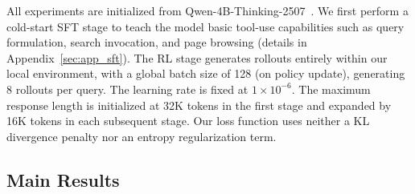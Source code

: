 \documentclass{article} %
\theoremstyle{plain}
\theoremstyle{definition}
\theoremstyle{remark}
\begin{document}
All experiments are initialized from Qwen-4B-Thinking-2507~\citep{yang2025qwen3}. We first perform a cold-start SFT stage to teach the model basic tool-use capabilities such as query formulation, search invocation, and page browsing (details in Appendix~\ref{sec:app_sft}). The RL stage generates rollouts entirely within our local environment, with a global batch size of 128 (on policy update), generating 8 rollouts per query. The learning rate is fixed at $1 \times 10^{-6}$. The maximum response length is initialized at 32K tokens in the first stage and expanded by 16K tokens in each subsequent stage. Our loss function uses neither a KL divergence penalty nor an entropy regularization term. 

\subsection{Main Results}
\end{document}
